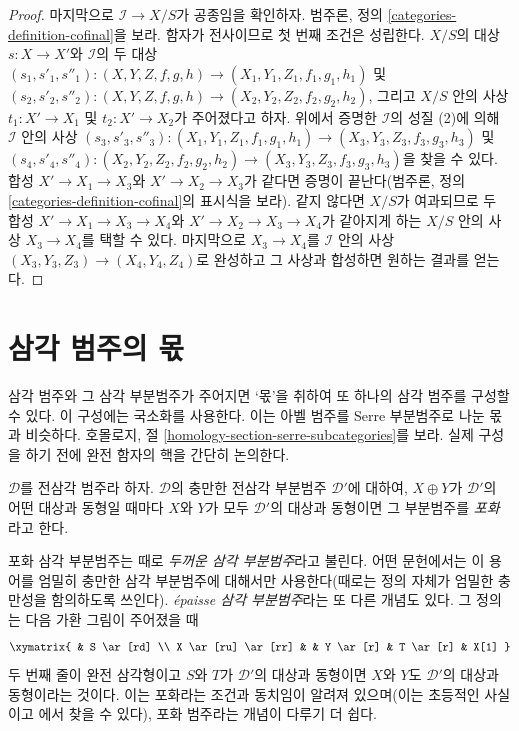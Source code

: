 \begin{proof}
\medskip\noindent
마지막으로 $\mathcal{I} \to X/S$가 공종임을 확인하자. 범주론, 정의
\ref{categories-definition-cofinal}을 보라. 함자가 전사이므로 첫 번째
조건은 성립한다. $X/S$의 대상 $s : X \to X'$와 $\mathcal{I}$의 두 대상
$(s_1, s'_1, s''_1) : (X, Y, Z, f, g, h) \to (X_1, Y_1, Z_1, f_1, g_1, h_1)$
및
$(s_2, s'_2, s''_2) : (X, Y, Z, f, g, h) \to (X_2, Y_2, Z_2, f_2, g_2, h_2)$,
그리고 $X/S$ 안의 사상 $t_1 : X' \to X_1$ 및
$t_2 : X' \to X_2$가 주어졌다고 하자. 위에서 증명한
$\mathcal{I}$의 성질 (2)에 의해 $\mathcal{I}$ 안의 사상
$(s_3, s'_3, s''_3) : (X_1, Y_1, Z_1, f_1, g_1, h_1) \to
(X_3, Y_3, Z_3, f_3, g_3, h_3)$
및
$(s_4, s'_4, s''_4) : (X_2, Y_2, Z_2, f_2, g_2, h_2) \to
(X_3, Y_3, Z_3, f_3, g_3, h_3)$을 찾을 수 있다.
합성 $X' \to X_1 \to X_3$와 $X' \to X_2 \to X_3$가 같다면
증명이 끝난다(범주론, 정의 \ref{categories-definition-cofinal}의
표시식을 보라). 같지 않다면 $X/S$가 여과되므로 두 합성
$X' \to X_1 \to X_3 \to X_4$와
$X' \to X_2 \to X_3 \to X_4$가 같아지게 하는 $X/S$ 안의 사상
$X_3 \to X_4$를 택할 수 있다. 마지막으로 $X_3 \to X_4$를
$\mathcal{I}$ 안의 사상 $(X_3, Y_3, Z_3) \to (X_4, Y_4, Z_4)$로
완성하고 그 사상과 합성하면 원하는 결과를 얻는다.
\end{proof}


\section{삼각 범주의 몫}
\label{section-quotients}

\noindent
삼각 범주와 그 삼각 부분범주가 주어지면 ‘몫’을 취하여 또 하나의
삼각 범주를 구성할 수 있다. 이 구성에는 국소화를 사용한다. 이는
아벨 범주를 Serre 부분범주로 나눈 몫과 비슷하다. 호몰로지, 절
\ref{homology-section-serre-subcategories}를 보라.
실제 구성을 하기 전에 완전 함자의 핵을 간단히 논의한다.

\begin{definition}
\label{definition-saturated}
$\mathcal{D}$를 전삼각 범주라 하자. $\mathcal{D}$의 충만한 전삼각
부분범주 $\mathcal{D}'$에 대하여, $X \oplus Y$가 $\mathcal{D}'$의
어떤 대상과 동형일 때마다 $X$와 $Y$가 모두 $\mathcal{D}'$의 대상과
동형이면 그 부분범주를 {\it 포화}라고 한다.
\end{definition}

\noindent
포화 삼각 부분범주는 때로 {\it 두꺼운 삼각 부분범주}라고 불린다.
어떤 문헌에서는 이 용어를 엄밀히 충만한 삼각 부분범주에 대해서만
사용한다(때로는 정의 자체가 엄밀한 충만성을 함의하도록 쓰인다).
{\it \'epaisse 삼각 부분범주}라는 또 다른 개념도 있다. 그 정의는
다음 가환 그림이 주어졌을 때
$$
\xymatrix{
& S \ar[rd] \\
X \ar[ru] \ar[rr] & & Y \ar[r] & T \ar[r] & X[1]
}
$$
두 번째 줄이 완전 삼각형이고 $S$와 $T$가 $\mathcal{D}'$의 대상과
동형이면 $X$와 $Y$도 $\mathcal{D}'$의 대상과 동형이라는 것이다.
이는 포화라는 조건과 동치임이 알려져 있으며(이는 초등적인 사실이고
\cite{Rickard-derived}에서 찾을 수 있다), 포화 범주라는 개념이
다루기 더 쉽다.

